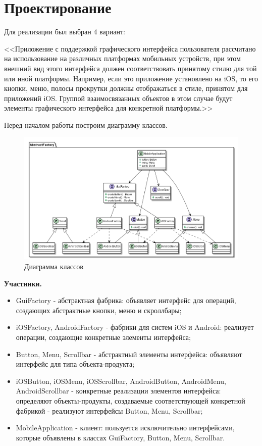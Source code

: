 \documentclass[PI,LAB]{HSEUniversity}
\begin{document}
\section{Проектирование}
Для реализации был выбран 4 вариант: 

<<Приложение с поддержкой графического интерфейса пользователя рассчитано на использование на различных платформах мобильных устройств, при этом внешний вид этого интерфейса должен соответствовать принятому стилю для той или иной платформы. Например, если это приложение установлено на iOS, то его кнопки, меню, полосы прокрутки должны отображаться в стиле, принятом для приложений iOS. Группой взаимосвязанных объектов в этом случае будут элементы графического интерфейса для конкретной платформы.>>

Перед началом работы построим диаграмму классов.
\begin{figure}[h]
  \centering
  \includegraphics[scale=0.5]{Task_CD.png}
  \caption{Диаграмма классов}
\end{figure}

\textbf{Участники.}
\begin{itemize}
  \item GuiFactory - абстрактная фабрика: объявляет интерфейс для операций, создающих абстрактные кнопки, меню и скроллбары;
  \item iOSFactory, AndroidFactory - фабрики для систем iOS и Android: реализует операции, создающие конкретные элементы интерфейса;
  \item Button, Menu, Scrollbar - абстрактный элементы интерфейса: объявляют интерфейс для типа объекта-продукта;
  \item iOSButton, iOSMenu, iOSScrollbar, AndroidButton, AndroidMenu, AndroidScrollbar - конкретные реализации элементов интерфейса: определяют объекты-продукты, создаваемые соответствующей конкретной фабрикой - реализуют интерфейсы Button, Menu, Scrollbar;
  \item MobileApplication - клиент: пользуется исключительно интерфейсами, которые объявлены в классах GuiFactory, Button, Menu, Scrollbar.
\end{itemize}
\end{document}

